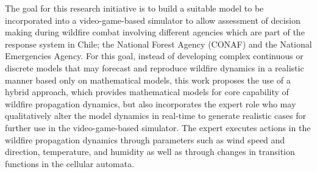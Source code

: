 \documentclass[conference]{IEEEtran}
\begin{document}
    The goal for this research initiative is to build a suitable model to be incorporated into a video-game-based 
    simulator to allow assessment of decision making during wildfire combat involving different agencies which are 
    part of the response system in Chile; the National Forest Agency (CONAF) and the National Emergencies Agency. 
    For this goal, instead of developing complex continuous or discrete models that may forecast and reproduce 
    wildfire dynamics in a realistic manner based only on mathematical models, this work proposes the use of a 
    hybrid approach, which provides mathematical models for core capability of wildfire propagation dynamics, 
    but also incorporates the expert role who may qualitatively alter the model dynamics in real-time to generate 
    realistic cases for further use in the video-game-based simulator. The expert executes actions in the wildfire 
    propagation dynamics through parameters such as wind speed and direction, temperature, and humidity as well as 
    through changes in transition functions in the cellular automata.



\end{document}
